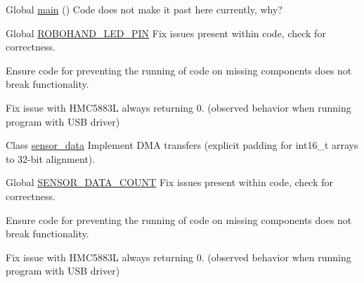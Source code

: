 
\begin{DoxyRefList}
\item[Global \mbox{\hyperlink{Robohand__uros_8c_ae66f6b31b5ad750f1fe042a706a4e3d4_ae66f6b31b5ad750f1fe042a706a4e3d4}{main}} ()]\label{todo__todo000004}%
%
Code does not make it past here currently, why?  
\item[Global \mbox{\hyperlink{Robohand_8h_a0bf8a969b88323b8d2b7559f1c984aad_a0bf8a969b88323b8d2b7559f1c984aad}{ROBOHAND\+\_\+\+LED\+\_\+\+PIN}} ]\label{todo__todo000002}%
%
Fix issues present within code, check for correctness. 

Ensure code for preventing the running of code on missing components does not break functionality. 

Fix issue with HMC5883L always returning 0. (observed behavior when running program with USB driver)  
\item[Class \mbox{\hyperlink{structsensor__data}{sensor\+\_\+data}} ]\label{todo__todo000003}%
%
Implement DMA transfers (explicit padding for int16\+\_\+t arrays to 32-\/bit alignment).  
\item[Global \mbox{\hyperlink{Robohand__uros_8h_aff698ed9accd74bcf1bc4dddd6ce1f75_aff698ed9accd74bcf1bc4dddd6ce1f75}{SENSOR\+\_\+\+DATA\+\_\+\+COUNT}} ]\label{todo__todo000001}%
%
Fix issues present within code, check for correctness. 

Ensure code for preventing the running of code on missing components does not break functionality. 

Fix issue with HMC5883L always returning 0. (observed behavior when running program with USB driver) 
\end{DoxyRefList}